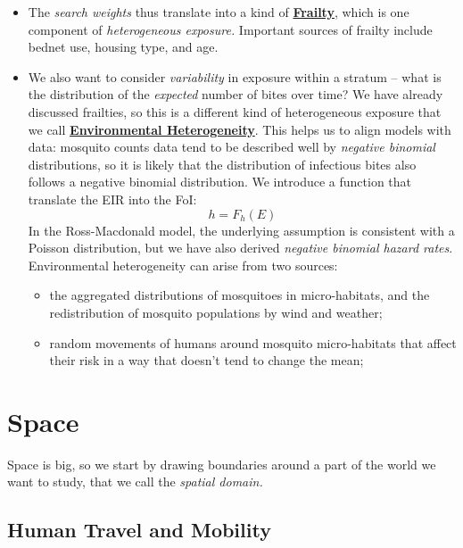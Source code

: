 \documentclass[
]{book}
\begin{document}
\begin{itemize}
\item
  The \emph{search weights} thus translate into a kind of \textbf{\protect\hyperlink{frailty}{Frailty}}, which is one component of \emph{heterogeneous exposure.} Important sources of frailty include bednet use, housing type, and age.
\item
  We also want to consider \emph{variability} in exposure within a stratum -- what is the distribution of the \emph{expected} number of bites over time? We have already discussed frailties, so this is a different kind of heterogeneous exposure that we call \textbf{\protect\hyperlink{environmentalHeterogeneity}{Environmental Heterogeneity}}. This helps us to align models with data: mosquito counts data tend to be described well by \emph{negative binomial} distributions, so it is likely that the distribution of infectious bites also follows a negative binomial distribution. We introduce a function that translate the EIR into the FoI:
  \[h=F_h(E)\]
  In the Ross-Macdonald model, the underlying assumption is consistent with a Poisson distribution, but we have also derived \emph{negative binomial hazard rates}. Environmental heterogeneity can arise from two sources:

  \begin{itemize}
  \item
    the aggregated distributions of mosquitoes in micro-habitats, and the redistribution of mosquito populations by wind and weather;
  \item
    random movements of humans around mosquito micro-habitats that affect their risk in a way that doesn't tend to change the mean;
  \end{itemize}
\end{itemize}

\hypertarget{space}{%
\section{Space}\label{space}}

Space is big, so we start by drawing boundaries around a part of the world we want to study, that we call the \emph{spatial domain.}

\hypertarget{human-travel-and-mobility}{%
\subsection{Human Travel and Mobility}\label{human-travel-and-mobility}}
\end{document}
